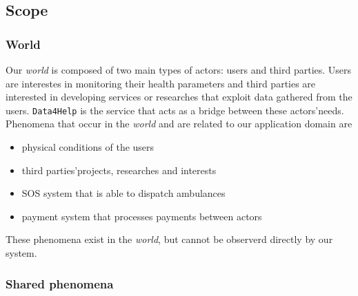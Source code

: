 
  \subsection{Scope}

    \subsubsection{World}

      Our \textit{world} is composed of two main types of actors: users and third parties. Users are interestes in monitoring their health parameters and third parties are interested in developing services or researches that exploit data gathered from the users. \texttt{Data4Help} is the service that acts as a bridge between these actors'needs. \\
      Phenomena that occur in the \textit{world} and are related to our application domain are
      \begin{itemize}
        \item physical conditions of the users
        \item third parties'projects, researches and interests
        \item SOS system that is able to dispatch ambulances
        \item payment system that processes payments between actors
      \end{itemize}
      These phenomena exist in the \textit{world}, but cannot be observerd directly by our system.

    \subsubsection{Shared phenomena}
    \label{sec:sharedp}

